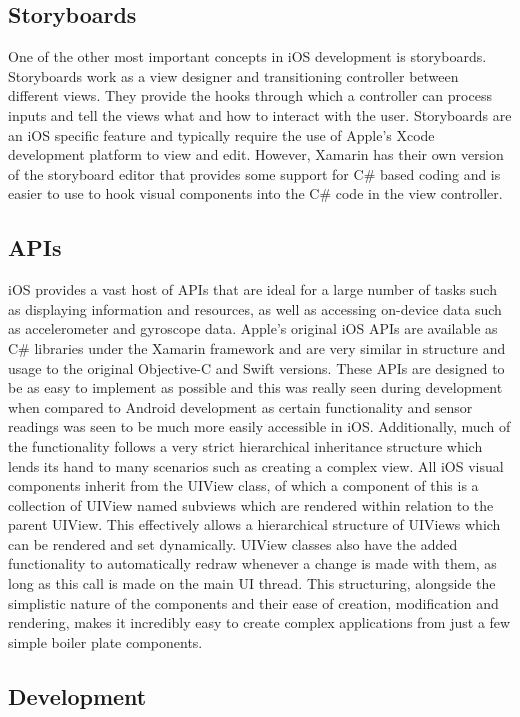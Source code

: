 \documentclass[12pt,a4paper]{report}
\begin{document}
\subsection{Storyboards}
One of the other most important concepts in iOS development is storyboards. Storyboards work as a view designer and transitioning controller between different views. They provide the hooks through which a controller can process inputs and tell the views what and how to interact with the user. Storyboards are an iOS specific feature and typically require the use of Apple's Xcode development platform to view and edit. However, Xamarin has their own version of the storyboard editor that provides some support for C\# based coding and is easier to use to hook visual components into the C\# code in the view controller.

\subsection{APIs}
iOS provides a vast host of APIs that are ideal for a large number of tasks such as displaying information and resources, as well as accessing on-device data such as accelerometer and gyroscope data. Apple’s original iOS APIs are available as C\# libraries under the Xamarin framework and are very similar in structure and usage to the original Objective-C and Swift versions. These APIs are designed to be as easy to implement as possible and this was really seen during development when compared to Android development as certain functionality and sensor readings was seen to be much more easily accessible in iOS. Additionally, much of the functionality follows a very strict hierarchical inheritance structure which lends its hand to many scenarios such as creating a complex view. All iOS visual components inherit from the UIView class, of which a component of this is a collection of UIView named subviews which are rendered within relation to the parent UIView. This effectively allows a hierarchical structure of UIViews which can be rendered and set dynamically. UIView classes also have the added functionality to automatically redraw whenever a change is made with them, as long as this call is made on the main UI thread. This structuring, alongside the simplistic nature of the components and their ease of creation, modification and rendering, makes it incredibly easy to create complex applications from just a few simple boiler plate components.

\subsection{Development}
\end{document}
